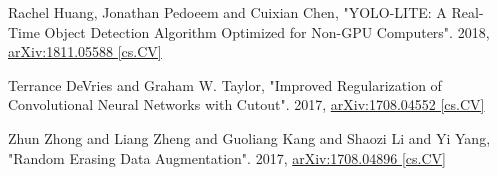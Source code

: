 \documentclass[10pt,twocolumn,letterpaper]{article}
\begin{document}
\begin{thebibliography}{9}
		Rachel Huang, Jonathan Pedoeem and Cuixian Chen, "YOLO-LITE: A Real-Time Object Detection Algorithm Optimized for Non-GPU Computers". 2018, \href{https://arxiv.org/abs/1811.05588}{arXiv:1811.05588 [cs.CV]}
		
		Terrance DeVries and Graham W. Taylor, "Improved Regularization of Convolutional Neural Networks with Cutout". 2017,
		\href{https://arxiv.org/abs/1708.04552}{arXiv:1708.04552 [cs.CV]}
		
		Zhun Zhong and Liang Zheng and Guoliang Kang and Shaozi Li and Yi Yang, "Random Erasing Data Augmentation". 2017,
		\href{https://arxiv.org/abs/1708.04896}{arXiv:1708.04896 [cs.CV]}
	
\end{thebibliography}


%
%
\end{document}
